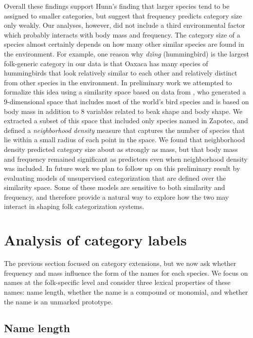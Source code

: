 \documentclass[10pt,letterpaper]{article}
\begin{document}
Overall these findings support Hunn's finding that larger species tend to be assigned to smaller categories, but suggest that frequency predicts category size only weakly. Our analyses, however,  did not include a third environmental factor  which probably interacts with body mass and frequency. The category size of a species almost certainly depends on how many other similar species are found in the environment. For example, one reason why \textit{dz\v{\i}n\b{g}} (hummingbird) is the largest folk-generic category in our data is that Oaxaca has many species of hummingbirds that look relatively similar to each other and relatively distinct from other species in the environment. 
In preliminary work we attempted to formalize this idea using a similarity space based on data from , who generated a 9-dimensional space that includes most of the world's bird species and is based on body mass in addition to 8 variables related to beak shape and body shape. We extracted a subset of this space that included only species named in Zapotec, and defined a \emph{neighborhood density} measure that captures the number of species that lie within a small radius of each point in the space. We found that neighborhood density predicted category size about as strongly as mass, but that body mass and frequency remained significant as predictors even when neighborhood density was included. In future work we plan to follow up on this preliminary result by evaluating models of unsupervised categorization that are defined over the similarity space. Some of these models are sensitive to both similarity and frequency, and therefore provide a natural way to explore how the two may interact in shaping folk categorization systems.

\section{Analysis of category labels}

The previous section focused on category extensions, but we now ask whether frequency and mass influence the form of the names for each species. We focus on names at the folk-specific level and consider three lexical properties of these names: name length, whether the name is a compound or monomial, and whether the name is an unmarked prototype.

\subsection{Name length}
\end{document}
